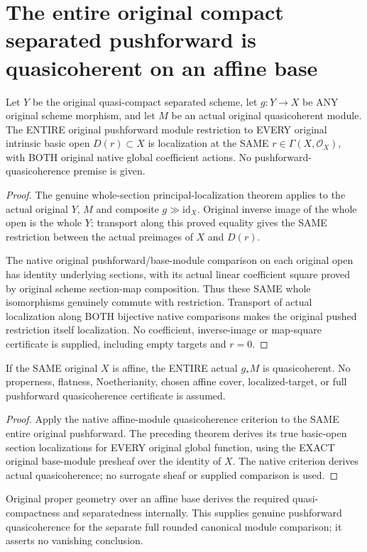 \section{The entire original compact separated pushforward is quasicoherent on an affine base}
\label{sec:compact-separated-pushforward-quasicoherent}

\begin{theorem}
\label{sc0-compact-pushqc:original-basic-restrictions}
\leanok
Let $Y$ be the original quasi-compact separated scheme, let
$g:Y\to X$ be ANY original scheme morphism, and let $M$ be an
actual original quasicoherent module. The ENTIRE original
pushforward module restriction to EVERY original intrinsic
basic open $D(r)\subset X$ is localization at the SAME
$r\in\Gamma(X,\mathcal O_X)$, with BOTH original native global
coefficient actions. No pushforward-quasicoherence premise is given.
\end{theorem}
\begin{proof}
The genuine whole-section principal-localization theorem applies
to the actual original $Y$, $M$ and composite $g\gg\mathrm{id}_X$.
Original inverse image of the whole open is the whole $Y$;
transport along this proved equality gives the SAME restriction
between the actual preimages of $X$ and $D(r)$.

The native original pushforward/base-module comparison on each
original open has identity underlying sections, with its actual
linear coefficient square proved by original scheme section-map
composition. Thus these SAME whole isomorphisms genuinely commute
with restriction. Transport of actual localization along BOTH
bijective native comparisons makes the original pushed restriction
itself localization. No coefficient, inverse-image or map-square
certificate is supplied, including empty targets and $r=0$.
\end{proof}

\begin{theorem}
\label{sc0-compact-pushqc:whole-original-pushforward}
\leanok
If the SAME original $X$ is affine, the ENTIRE actual $g_*M$
is quasicoherent. No properness, flatness, Noetherianity,
chosen affine cover, localized-target, or full pushforward
quasicoherence certificate is assumed.
\end{theorem}
\begin{proof}
Apply the native affine-module quasicoherence criterion to the
SAME entire original pushforward. The preceding theorem derives
its true basic-open section localizations for EVERY original
global function, using the EXACT original base-module presheaf
over the identity of $X$. The native criterion derives actual
quasicoherence; no surrogate sheaf or supplied comparison is used.
\end{proof}

Original proper geometry over an affine base derives the required
quasi-compactness and separatedness internally. This supplies
genuine pushforward quasicoherence for the separate full rounded
canonical module comparison; it asserts no vanishing conclusion.
